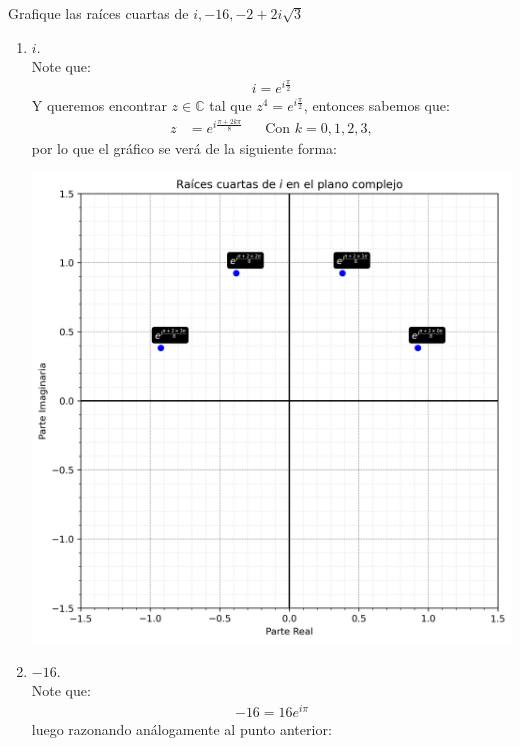 \begin{homeworkProblem}
  Grafique las raíces cuartas de $i,-16,-2+2i\sqrt{3}$
  \begin{solution}
    \begin{enumerate}
      \item $i$.\\
        Note que:
        \begin{align*}
          i=e^{i\frac{\pi}{2}}  
        \end{align*}
        Y queremos encontrar $z\in\mathbb{C}$ tal que $z^4=e^{i\frac{\pi}{2}}$, entonces sabemos que:
        \begin{align*}
          z&=e^{i\frac{\pi+2k\pi}{8}} &&\text{Con $k=0,1,2,3$},
        \end{align*}
        por lo que el gráfico se verá de la siguiente forma:
        \begin{center}
          \includegraphics[scale=0.4]{images/grafico_raices_cuartas_i.png}  
        \end{center}
      \item $-16$.\\
        Note que:
        \begin{align*}
          -16=16e^{i\pi}
        \end{align*}
        luego razonando análogamente al punto anterior:
        \begin{align*}

\end{align*}
\end{enumerate}
\end{solution}
\end{homeworkProblem}
